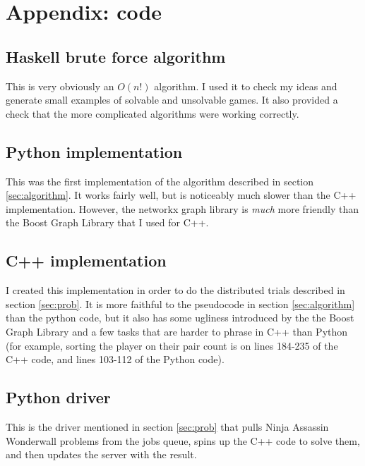 \documentclass[12pt,x11names, rgb]{article}
\begin{document}
\section{Appendix: code}
    \renewcommand{\ttdefault}{pcr}
    \subsection{Haskell brute force algorithm}
        This is very obviously an $O(n!)$ algorithm. I used it to check my ideas and generate small examples of solvable and unsolvable games. It also provided a check that the more complicated algorithms were working correctly.
        
    \subsection{Python implementation}
        This was the first implementation of the algorithm described in section \ref{sec:algorithm}. It works fairly well, but is noticeably much slower than the C++ implementation. However, the networkx graph library is \emph{much} more friendly than the Boost Graph Library that I used for C++.
        
    \subsection{C++ implementation}
        I created this implementation in order to do the distributed trials described in section \ref{sec:prob}. It is more faithful to the pseudocode in section \ref{sec:algorithm} than the python code, but it also has some ugliness introduced by the the Boost Graph Library and a few tasks that are harder to phrase in C++ than Python (for example, sorting the player on their pair count is on lines 184-235 of the C++ code, and lines 103-112 of the Python code).
        
    \subsection{Python driver}
        This is the driver mentioned in section \ref{sec:prob} that pulls Ninja Assassin Wonderwall problems from the jobs queue, spins up the C++ code to solve them, and then updates the server with the result.
        
\end{document}
